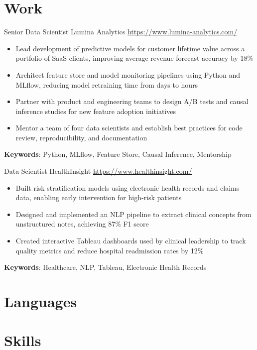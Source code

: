 \documentclass[a4paper, serif, 10pt]{moderncv}
\begin{document}
\section{Work}

        {Senior Data Scientist}
        {Lumina Analytics}
        {\url{https://www.lumina-analytics.com/}}
        {}
        {\begin{itemize}
\item Lead development of predictive models for customer lifetime value across a portfolio of SaaS clients, improving average revenue forecast accuracy by 18\%
\item Architect feature store and model monitoring pipelines using Python and MLflow, reducing model retraining time from days to hours
\item Partner with product and engineering teams to design A/B tests and causal inference studies for new feature adoption initiatives
\item Mentor a team of four data scientists and establish best practices for code review, reproducibility, and documentation
\end{itemize}
\textbf{Keywords}: Python, MLflow, Feature Store, Causal Inference, Mentorship}

        {Data Scientist}
        {HealthInsight}
        {\url{https://www.healthinsight.com/}}
        {}
        {\begin{itemize}
\item Built risk stratification models using electronic health records and claims data, enabling early intervention for high-risk patients
\item Designed and implemented an NLP pipeline to extract clinical concepts from unstructured notes, achieving 87\% F1 score
\item Created interactive Tableau dashboards used by clinical leadership to track quality metrics and reduce hospital readmission rates by 12\%
\end{itemize}
\textbf{Keywords}: Healthcare, NLP, Tableau, Electronic Health Records}
\section{Languages}

\section{Skills}
\end{document}

